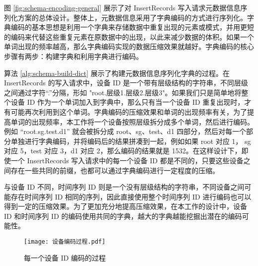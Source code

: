 图 \ref{fig:schema-encoding-general} 展示了对 InsertRecords 写入请求元数据信息序列化方案的总体设计。整体上，元数据信息采用了字典编码的方式进行序列化。字典编码的基本思想是利用一个字典来存储数据中重复出现的元素或模式，并用更短的编码来代替这些重复元素在原数据中的出现，以此来减少数据的体积。如果一个单词出现的频率越高，那么字典编码实现的数据压缩效果就越好。字典编码的核心步骤有两步：构建字典和利用字典进行编码。

 算法 \ref{alg:schema-build-dict} 展示了构建元数据信息序列化字典的过程。在 InsertRecords 的写入请求中，设备 ID 是一个带有层级结构的字符串，不同层级之间通过字符“.”分隔，形如 "root.层级1.层级2.层级3"。如果我们只是简单地将整个设备 ID 作为一个单词加入到字典中，那么只有当一个设备 ID 重复出现时，才有可能再次利用到这个单词。字典编码的压缩效果和单词的出现频率有关，为了提高单词的出现频率，本工作将一个设备按照层级拆分成多个单词，然后进行编码。例如 “root.sg.test.d1” 就会被拆分成 root、sg、test、d1 四部分，然后对每一个部分单独进行字典编码，并将编码后的结果拼凑到一起，例如如果 root 对应 1， sg 对应 5，test 对应 3，d1 对应 2，那么编码的结果就是 1532。在这样设计下，即使一个 InsertRecords 写入请求中的每一个设备 ID 都是不同的，只要这些设备之间存在一些共同的前缀，也都可以通过字典编码进行一定程度的压缩。

与设备 ID 不同，时间序列 ID 则是一个没有层级结构的字符串，不同设备之间可能存在时间序列 ID 相同的序列，因此直接使用整个时间序列 ID 进行编码也可以得到一定的压缩效果。为了更加充分地提高压缩效果，在本工作的设计中，设备 ID 和时间序列 ID 的编码使用共同的字典，越大的字典越能挖掘出潜在的编码可能性。
\begin{figure}
  \centering
  \texttt{[image: 设备编码过程.pdf]}
  \caption{每一个设备 ID 编码的过程}
  \label{fig:device-id-encoding}
\end{figure}

